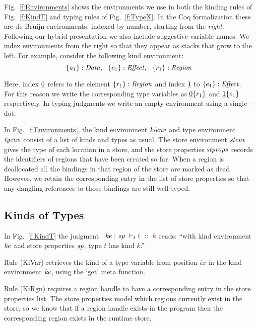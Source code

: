 
Fig.~\ref{f:Environments} shows the environments we use in both the kinding rules of Fig.~\ref{f:KindT} and typing rules of Fig.~\ref{f:TypeX}. In the Coq formalization these are de Bruijn environments, indexed by number, starting from the \emph{right}. Following our hybrid presentation we also include suggestive variable names. We index environments from the right so that they appear as stacks that grow to the left. For example, consider the following kind environment:
$$
\{a_1\} : \mathit{Data},~~ \{e_1\} : \mathit{Effect},~~ \{r_1\} : \mathit{Region}
$$

Here, index $\underline{0}$ refers to the element $\{r_1\} : \mathit{Region}$ and index $\underline{1}$ to $\{e_1\} : \mathit{Effect}$. For this reason we write the corresponding type variables as $\underline{0}\{r_1\}$ and $\underline{1}\{e_1\}$ respectively. In typing judgments we write an empty environment using a single $\cdot$ dot.

In Fig.~\ref{f:Environments}, the kind environment $\mathit{kienv}$ and type environment $\mathit{tyenv}$ consist of a list of kinds and types as usual. The store environment $\mathit{stenv}$ gives the type of each location in a store, and the store properties $\mathit{stprops}$ records the identifiers of regions that have been created so far. When a region is deallocated all the bindings in that region of the store are marked as dead. However, we retain the corresponding entry in the list of store properties so that any dangling references to those bindings are still well typed.






\subsection{Kinds of Types}
In Fig.~\ref{f:KindT} the judgment ~$\KindT{\mke}{\msp}{t}{k}$ reads: ``with kind environment $\mathit{ke}$ and store properties $\mathit{sp}$, type $t$ has kind $k$.'' 

Rule (KiVar) retrieves the kind of a type variable from position $ix$ in the kind environment $\mathit{ke}$, using the `get' meta function. 

Rule (KiRgn) requires a region handle to have a corresponding entry in the store properties list. The store properties model which regions currently exist in the store, so we know that if a region handle exists in the program then the corresponding region exists in the runtime store.

